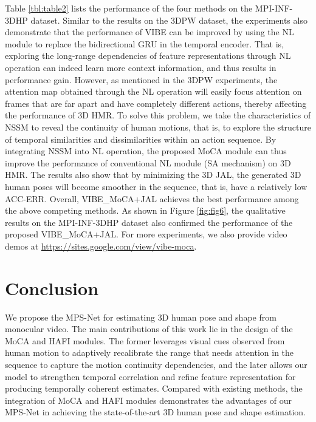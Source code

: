 \documentclass[10pt,twocolumn,letterpaper]{article}
\begin{document}
Table \ref{tbl:table2} lists the performance of the four methods on the MPI-INF-3DHP dataset. Similar to the results on the 3DPW dataset, the experiments also demonstrate that the performance of VIBE can be improved by using the NL module to replace the bidirectional GRU in the temporal encoder. That is, exploring the long-range dependencies of feature representations through NL operation can indeed learn more context information, and thus results in performance gain. However, as mentioned in the 3DPW experiments, the attention map obtained through the NL operation will easily focus attention on frames that are far apart and have completely different actions, thereby affecting the performance of 3D HMR. To solve this problem, we take the characteristics of NSSM to reveal the continuity of human motions, that is, to explore the structure of temporal similarities and dissimilarities within an action sequence. By integrating NSSM into NL operation, the proposed MoCA module can thus improve the performance of conventional NL module (\ie SA mechanism) on 3D HMR. The results also show that by minimizing the 3D JAL, the generated 3D human poses will become smoother in the sequence, that is, have a relatively low ACC-ERR. Overall, VIBE\_{MoCA+JAL} achieves the best performance among the above competing methods. As shown in Figure \ref{fig:fig6}, the qualitative results on the MPI-INF-3DHP dataset also confirmed the performance of the proposed VIBE\_{MoCA+JAL}. For more experiments, we also provide video demos at \url{https://sites.google.com/view/vibe-moca}.
\fi
\vspace{-4pt}
\section{Conclusion}\vspace{-7pt}

We propose the MPS-Net for estimating 3D human pose and shape from monocular video. The main contributions of this work lie in the design of the MoCA and HAFI modules. The former leverages visual cues observed from human motion to adaptively recalibrate the range that needs attention in the sequence to capture the motion continuity dependencies, and the later allows our model to strengthen temporal correlation and refine feature representation for producing temporally coherent estimates. Compared with existing methods, the integration of MoCA and HAFI modules demonstrates the advantages of our MPS-Net in achieving the state-of-the-art 3D human pose and shape estimation.\vspace{2pt}
\end{document}
